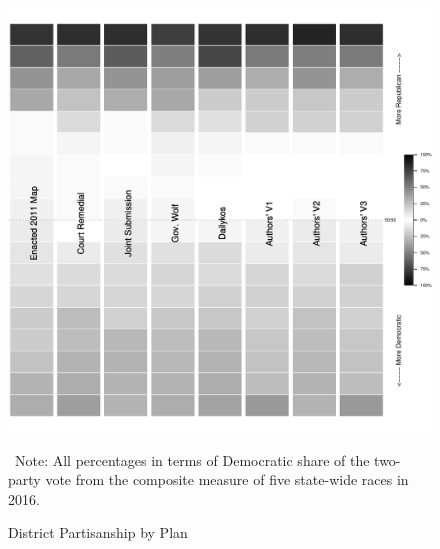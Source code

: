 
 
\begin{figure}
    \begin{center}
    \caption{District Partisanship by Plan}
    \label{fig:barplot_partisanship}
    \includegraphics[width=1\textwidth]{Figures/fig_barplotPartisanship.pdf}
    \end{center}
    \hrulefill \
    \footnotesize{Note: All percentages in terms of Democratic share of the two-party vote from the composite measure of five state-wide races in 2016.}
\end{figure}
